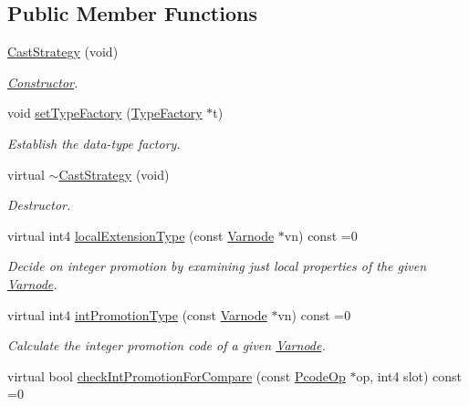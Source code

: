 \subsection*{Public Member Functions}
\begin{DoxyCompactItemize}
\item 
\mbox{\hyperlink{class_cast_strategy_a40149d0e0a08e532c51a08fa297dbef0}{Cast\+Strategy}} (void)
\begin{DoxyCompactList}\small\item\em \mbox{\hyperlink{class_constructor}{Constructor}}. \end{DoxyCompactList}\item 
void \mbox{\hyperlink{class_cast_strategy_ae2b05a7a9e2087e7de589a8c4fb2c74a}{set\+Type\+Factory}} (\mbox{\hyperlink{class_type_factory}{Type\+Factory}} $\ast$t)
\begin{DoxyCompactList}\small\item\em Establish the data-\/type factory. \end{DoxyCompactList}\item 
virtual \mbox{\hyperlink{class_cast_strategy_a0ecd3cc985eae0bc17658cad21f3c82e}{$\sim$\+Cast\+Strategy}} (void)
\begin{DoxyCompactList}\small\item\em Destructor. \end{DoxyCompactList}\item 
virtual int4 \mbox{\hyperlink{class_cast_strategy_af9c6535f6d9337185887dba89ccb9de3}{local\+Extension\+Type}} (const \mbox{\hyperlink{class_varnode}{Varnode}} $\ast$vn) const =0
\begin{DoxyCompactList}\small\item\em Decide on integer promotion by examining just local properties of the given \mbox{\hyperlink{class_varnode}{Varnode}}. \end{DoxyCompactList}\item 
virtual int4 \mbox{\hyperlink{class_cast_strategy_a69b81cbe074f60bf95bd8823e7bf191c}{int\+Promotion\+Type}} (const \mbox{\hyperlink{class_varnode}{Varnode}} $\ast$vn) const =0
\begin{DoxyCompactList}\small\item\em Calculate the integer promotion code of a given \mbox{\hyperlink{class_varnode}{Varnode}}. \end{DoxyCompactList}\item 
virtual bool \mbox{\hyperlink{class_cast_strategy_ae91ae0dbea2811795e386298633f05f3}{check\+Int\+Promotion\+For\+Compare}} (const \mbox{\hyperlink{class_pcode_op}{Pcode\+Op}} $\ast$op, int4 slot) const =0

\end{DoxyCompactItemize}
